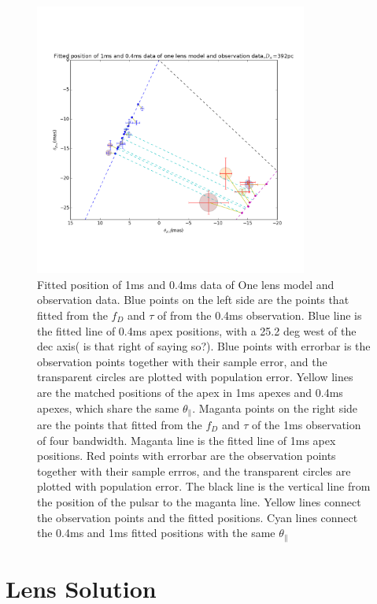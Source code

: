 \documentclass[useAMS,usenatbib]{mn2e}
\begin{document}
\begin{figure}
\centering
\includegraphics[width=0.8\textwidth, angle=0]{One_lens_392pc.png}
\caption{Fitted position of 1ms and 0.4ms data of One lens model and observation data. Blue points on the left side are the points that fitted from the $f_D$ and $\tau$ of from the 0.4ms observation. Blue line is the fitted line of 0.4ms apex positions, with a 25.2 deg west of the dec axis( is that right of saying so?). Blue points with errorbar is the observation points together with their sample error, and the transparent circles are plotted with population error. Yellow lines are the matched positions of the apex in 1ms apexes and 0.4ms apexes, which share the same $\theta_{\parallel}$. Maganta points on the right side are the points that fitted from the $f_D$ and $\tau$ of the 1ms observation of four bandwidth. Maganta line is the fitted line of 1ms apex positions. Red points with errorbar are the observation points together with their sample errros, and the transparent circles are plotted with population error. The black line is the vertical line from the position of the pulsar to the maganta line. Yellow lines connect the observation points and the fitted positions. Cyan lines connect the 0.4ms and 1ms fitted positions with the same $\theta_{\parallel}$ }\label{Onelens}
\end{figure}


\section{Lens Solution}
\end{document}

